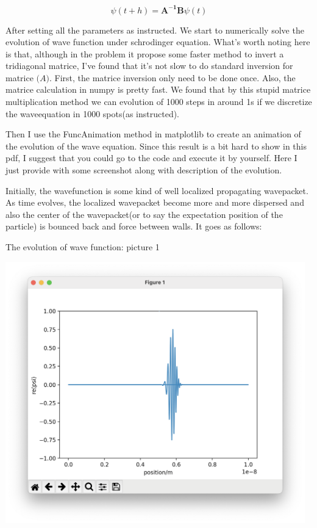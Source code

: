\documentclass[letterpaper,12pt]{article}
\begin{document}
\begin{equation}
    \psi(t+h)= \mathbf{A^{-1}}  \mathbf{B} \psi(t)
\end{equation}

After setting all the parameters as instructed. We start to numerically solve the evolution of wave function under schrodinger equation. What's worth noting here is that, although in the problem it propose some faster method to invert a tridiagonal matrice, I've found that it's not slow to do standard inversion for matrice $\mathbf(A)$. First, the matrice inversion only need to be done once. Also, the matrice calculation in numpy is pretty fast. We found that by this stupid matrice multiplication method we can evolution of 1000 steps in around 1s if we discretize the waveequation in 1000 spots(as instructed).

Then I use the FuncAnimation method in matplotlib to create an animation of the evolution of the wave equation. Since this result is a bit hard to show in this pdf, I suggest that you could go to the code and execute it by yourself. Here I just provide with some screenshot along with description of the evolution.
\newpage


Initially, the wavefunction is some kind of well localized propagating wavepacket. As time evolves, the localized wavepacket become more and more dispersed and also the center of the wavepacket(or to say the expectation position of the particle) is bounced back and force between walls. It goes as follows:

\begin{table}[!h]
    \centering
    \caption{The evolution of wave function: picture 1}
    \includegraphics[width=13cm]{1}
\end{table}%
\newpage
\end{document}
